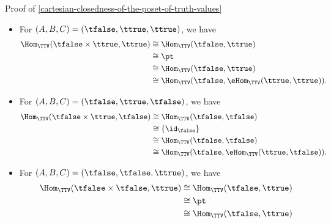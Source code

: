\begin{Proof}{Proof of \cref{cartesian-closedness-of-the-poset-of-truth-values}}
\begin{itemize}
\begin{align*}
                \Hom_{\TTV}(\ttrue\times\tfalse,\tfalse)  &\cong \Hom_{\TTV}(\tfalse,\tfalse)\\
                                                          &\cong \{\id_{\false}\}\\
                                                          &\cong \Hom_{\TTV}(\tfalse,\tfalse)\\
                                                          &\cong \Hom_{\TTV}(\ttrue,\eHom_{\TTV}(\tfalse,\tfalse)).
            \end{align*}
        \item For $(A,B,C)=(\tfalse,\ttrue,\ttrue)$, we have
            \begin{align*}
                \Hom_{\TTV}(\tfalse\times\ttrue,\ttrue)   &\cong \Hom_{\TTV}(\tfalse,\ttrue)\\
                                                          &\cong \pt\\
                                                          &\cong \Hom_{\TTV}(\tfalse,\ttrue)\\
                                                          &\cong \Hom_{\TTV}(\tfalse,\eHom_{\TTV}(\ttrue,\ttrue)).
            \end{align*}
        \item For $(A,B,C)=(\tfalse,\ttrue,\tfalse)$, we have
            \begin{align*}
                \Hom_{\TTV}(\tfalse\times\ttrue,\tfalse)  &\cong \Hom_{\TTV}(\tfalse,\tfalse)\\
                                                          &\cong \{\id_{\false}\}\\
                                                          &\cong \Hom_{\TTV}(\tfalse,\tfalse)\\
                                                          &\cong \Hom_{\TTV}(\tfalse,\eHom_{\TTV}(\ttrue,\tfalse)).
            \end{align*}
        \item For $(A,B,C)=(\tfalse,\tfalse,\ttrue)$, we have
            \begin{align*}
                \Hom_{\TTV}(\tfalse\times\tfalse,\ttrue)  &\cong \Hom_{\TTV}(\tfalse,\ttrue)\\
                                                          &\cong \pt\\
                                                          &\cong \Hom_{\TTV}(\tfalse,\ttrue)\\

\end{align*}
\end{itemize}
\end{Proof}
